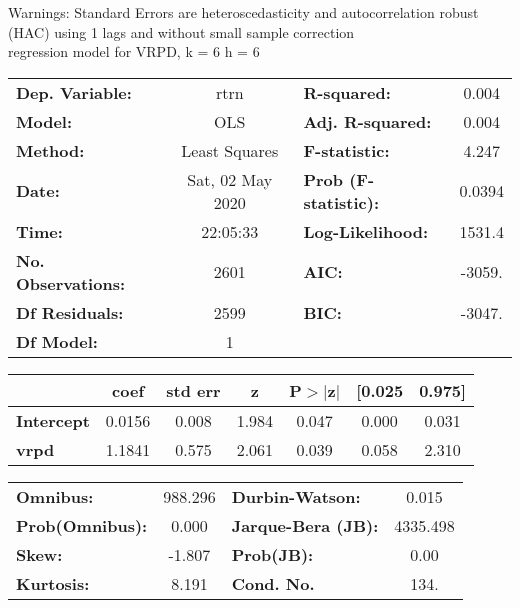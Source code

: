 Warnings: \newline
 [1] Standard Errors are heteroscedasticity and autocorrelation robust (HAC) using 1 lags and without small sample correction\\ 

regression model for VRPD, k = 6 h = 6\begin{center}
\begin{tabular}{lclc}
\toprule
\textbf{Dep. Variable:}    &       rtrn       & \textbf{  R-squared:         } &     0.004   \\
\textbf{Model:}            &       OLS        & \textbf{  Adj. R-squared:    } &     0.004   \\
\textbf{Method:}           &  Least Squares   & \textbf{  F-statistic:       } &     4.247   \\
\textbf{Date:}             & Sat, 02 May 2020 & \textbf{  Prob (F-statistic):} &   0.0394    \\
\textbf{Time:}             &     22:05:33     & \textbf{  Log-Likelihood:    } &    1531.4   \\
\textbf{No. Observations:} &        2601      & \textbf{  AIC:               } &    -3059.   \\
\textbf{Df Residuals:}     &        2599      & \textbf{  BIC:               } &    -3047.   \\
\textbf{Df Model:}         &           1      & \textbf{                     } &             \\
\bottomrule
\end{tabular}
\begin{tabular}{lcccccc}
                   & \textbf{coef} & \textbf{std err} & \textbf{z} & \textbf{P$> |$z$|$} & \textbf{[0.025} & \textbf{0.975]}  \\
\midrule
\textbf{Intercept} &       0.0156  &        0.008     &     1.984  &         0.047        &        0.000    &        0.031     \\
\textbf{vrpd}      &       1.1841  &        0.575     &     2.061  &         0.039        &        0.058    &        2.310     \\
\bottomrule
\end{tabular}
\begin{tabular}{lclc}
\textbf{Omnibus:}       & 988.296 & \textbf{  Durbin-Watson:     } &    0.015  \\
\textbf{Prob(Omnibus):} &   0.000 & \textbf{  Jarque-Bera (JB):  } & 4335.498  \\
\textbf{Skew:}          &  -1.807 & \textbf{  Prob(JB):          } &     0.00  \\
\textbf{Kurtosis:}      &   8.191 & \textbf{  Cond. No.          } &     134.  \\
\bottomrule
\end{tabular}
\end{center}

